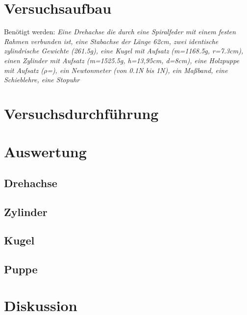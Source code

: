\section{Versuchsaufbau}\justifying

Benötigt werden: \textit{Eine Drehachse die durch eine Spiralfeder mit einem festen Rahmen verbunden ist, eine Stabachse der Länge 62cm, zwei
identische zylindrische Gewichte (261.5g), eine Kugel mit Aufsatz (m=1168.5g, r=7.3cm), einen Zylinder mit Aufsatz (m=1525.5g, h=13,95cm, d=8cm), 
eine Holzpuppe mit Aufsatz ($\rho$=), ein Newtonmeter (von 0.1N bis 1N), ein Ma\ss band, eine Schieblehre, eine Stopuhr}

\section{Versuchsdurchführung}\justifying

\section{Auswertung}\justifying

\subsection{Drehachse}\justifying

\subsection{Zylinder}\justifying

\subsection{Kugel}\justifying

\subsection{Puppe}\justifying

\section{Diskussion}\justifying

\newpage

\printbibliography
